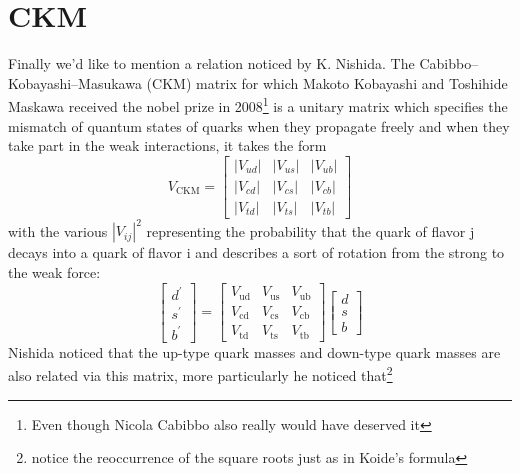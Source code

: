 \documentclass[twoside,twocolumn,11pt]{article} %
\begin{document}
\section{CKM}
Finally we'd like to mention a relation noticed by K. Nishida\cite{CKM}. The Cabibbo–Kobayashi–Masukawa (CKM) matrix for which Makoto Kobayashi and Toshihide Maskawa received the nobel prize in 2008\footnote{Even though  Nicola Cabibbo also really would have deserved it} is a unitary matrix which specifies the mismatch of quantum states of quarks when they propagate freely and when they take part in the weak interactions, it takes the form
\begin{equation}
	V_{\mathrm{CKM}}= 
		\left[\begin{array}{ccc}
		\left|V_{u d}\right| & \left|V_{u s}\right| & \left|V_{u b}\right| \\
		\left|V_{c d}\right| & \left|V_{c s}\right| & \left|V_{c b}\right| \\
		\left|V_{t d}\right| & \left|V_{t s}\right| & \left|V_{t b}\right|
		\end{array}\right]
\end{equation}
with the various $|V_{ij}|^2$ representing the probability that the quark of flavor j decays into a quark of flavor i and describes a sort of rotation from the strong to the weak force:
\begin{equation}
	\left[\begin{array}{c}
		d^{\prime} \\
		s^{\prime} \\
		b^{\prime}
	\end{array}\right]=\left[\begin{array}{lll}
		V_{\mathrm{ud}} & V_{\mathrm{us}} & V_{\mathrm{ub}} \\
		V_{\mathrm{cd}} & V_{\mathrm{cs}} & V_{\mathrm{cb}} \\
		V_{\mathrm{td}} & V_{\mathrm{ts}} & V_{\mathrm{tb}}
	\end{array}\right]\left[\begin{array}{l}
		d \\
		s \\
		b
	\end{array}\right]
\end{equation}
Nishida noticed that the up-type quark masses and down-type quark masses are also related via this matrix, more particularly he noticed that\footnote{notice the reoccurrence of the square roots just as in Koide's formula}
\end{document}
